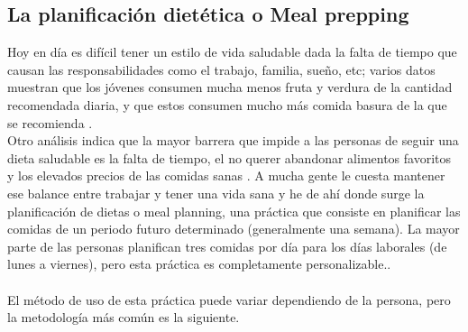 \documentclass[twoside, openright, 11pt]{report}
\begin{document}
		\subsection*{La planificación dietética o Meal prepping}
		Hoy en día es difícil tener un estilo de vida saludable dada la falta de tiempo que causan las responsabilidades como el trabajo, familia, sueño, etc; varios datos muestran que los jóvenes consumen mucha menos fruta y verdura de la cantidad recomendada diaria, y que estos consumen mucho más comida basura de la que se recomienda \cite{NLMDifficultyEatingHealthy}.
		\\
		Otro análisis indica que la mayor barrera que impide a las personas de seguir una dieta saludable es la falta de tiempo, el no querer abandonar alimentos favoritos y los elevados precios de las comidas sanas \cite{NLMDifficultyEatingHealthy}. A mucha gente le cuesta mantener ese balance entre trabajar y tener una vida sana y he de ahí donde surge la planificación de dietas o meal planning, una práctica que consiste en planificar las comidas de un periodo futuro determinado (generalmente una semana). La mayor parte de las personas planifican tres comidas por día para los días laborales (de lunes a viernes), pero esta práctica es completamente personalizable.\cite{HowToMealPrep}.
		\\
		\\
		El método de uso de esta práctica puede variar dependiendo de la persona, pero la metodología más común es la siguiente.
\end{document}
